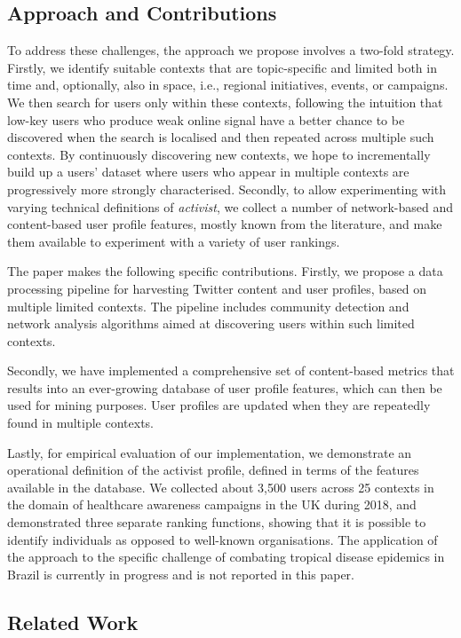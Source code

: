 \subsection{Approach and Contributions}

To address these challenges, the approach we propose involves a two-fold strategy. 
Firstly, we identify suitable contexts that are topic-specific and limited both in time and, optionally, also in space, i.e., regional initiatives, events, or campaigns.
We then search for users only within these contexts, following the intuition that low-key users who produce weak online signal have a better chance to be discovered when the search is localised and then repeated across multiple such contexts.
By continuously discovering new contexts, we hope to incrementally build up a users' dataset where users who appear in multiple contexts are progressively more strongly characterised.
%
Secondly, to allow experimenting with varying technical definitions of \textit{activist}, we collect a number of network-based and content-based user profile features, mostly known from the literature, and make them available to experiment with a variety of user rankings.

The paper makes the following specific contributions.
%
Firstly, we propose a data processing pipeline for harvesting Twitter content and user profiles, based on multiple limited contexts. 
The pipeline includes community detection and network analysis algorithms aimed at discovering users within such limited contexts.

Secondly, we have implemented a comprehensive set of content-based metrics that results into an ever-growing database of user profile features, which can then be used for mining purposes. 
User profiles are updated when they are repeatedly found in multiple contexts.

Lastly, for empirical evaluation of our implementation, we demonstrate an operational definition of the activist profile, defined in terms of the features available in the database. We collected about 3,500 users  across 25 contexts in the domain of healthcare awareness campaigns in the UK during 2018, and demonstrated three separate ranking functions, showing that it is possible to identify individuals as opposed to well-known organisations.
The application of the approach to the specific challenge of combating tropical disease epidemics in Brazil is currently in progress and is not reported in this paper.

\subsection{Related Work}  \label{sec:related}

